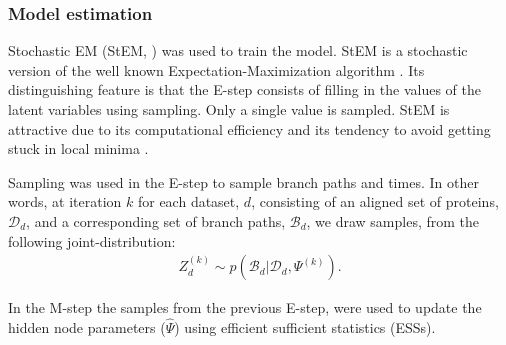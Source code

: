 \documentclass[nogrid]{MBE}%
\begin{document}
\subsubsection{Model estimation}
Stochastic EM (StEM, \citet{gilks1995markov}) was used to train the model. StEM  is a stochastic version of the well known Expectation-Maximization algorithm \citep{gilks1995markov}. Its distinguishing feature is that the E-step consists of filling in the values of the latent variables using sampling. Only a single value is sampled. StEM is attractive due to its computational efficiency and its tendency to avoid getting stuck in local minima \citep{gilks1995markov}.

Sampling was used in the E-step to sample branch paths and times. In other words, at iteration $k$ for each dataset, $d$, consisting of an aligned set of proteins, $\mathcal{D}_d$,  and a corresponding set of branch paths, $\mathcal{B}_d$, we draw samples, from the following joint-distribution:
\begin{align*}
Z_{d}^{(k)}\sim p(\mathcal{B}_d|\mathcal{D}_d,\Psi^{(k)}).
\end{align*}

In the M-step the samples from the previous E-step, were used to update the hidden node parameters ($\hat{\Psi}$) using efficient sufficient statistics (ESSs).

\end{document}
